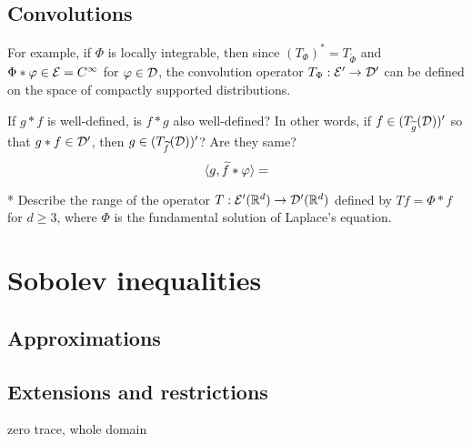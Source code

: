 \documentclass{../note}
\begin{document}
\section{Convolutions}
For example, if $\Phi$ is locally integrable, then since $(T_\Phi)^*=T_{\tilde\Phi}$ and $\Phi*\varphi\in\mathcal{E}=C^\infty$ for $\varphi\in\mathcal{D}$, the convolution operator $T_\Phi:\mathcal{E}'\to\mathcal{D}'$ can be defined on the space of compactly supported distributions.

If $g*f$ is well-defined, is $f*g$ also well-defined?
In other words, if $f\in(T_{\widetilde g}(\mathcal{D}))'$ so that $g*f\in\mathcal{D}'$, then $g\in(T_{\widetilde f}(\mathcal{D}))'$? Are they same?
\[\langle g,\widetilde f*\varphi\rangle=\]



\begin{prb}*
Describe the range of the operator $T:\mathcal{E}'(\mathbb{R}^d)\to\mathcal{D}'(\mathbb{R}^d)$ defined by $Tf=\Phi*f$ for $d\ge3$, where $\Phi$ is the fundamental solution of Laplace's equation.
\end{prb}








\chapter{Sobolev inequalities}

\section{Approximations}
\begin{prb}
\end{prb}
\begin{prb}
\end{prb}
\begin{prb}
\end{prb}
\begin{prb}
\end{prb}

\section{Extensions and restrictions}
\begin{prb}
\end{prb}
\begin{prb}
\end{prb}
\begin{prb}
\end{prb}
\begin{prb}
zero trace, whole domain
\end{prb}
\end{document}
